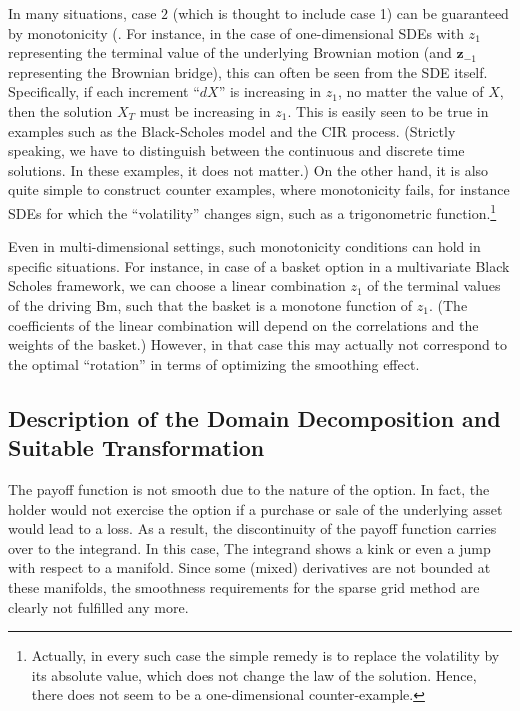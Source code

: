 In many situations, case $2$ (which is thought to include case 1) can be
guaranteed by monotonicity (. For instance, in the case of one-dimensional SDEs
with $z_1$ representing the terminal value of the underlying Brownian motion (and $\mathbf{z}_{-1}$ representing the Brownian bridge), this can often be seen from the SDE itself. Specifically, if each increment ``$dX$'' is increasing in $z_1$, no matter the value of $X$, then the solution $X_T$ must be increasing
in $z_1$. This is easily seen to be true in examples such as the Black-Scholes model and the CIR process. (Strictly speaking, we have to distinguish between the continuous and discrete time solutions. In these examples, it does not matter.) On the other hand, it is also quite simple to construct counter examples, where monotonicity fails, for instance SDEs for which the ``volatility'' changes sign, such as a trigonometric function.\footnote{Actually, in every such case the simple remedy is to replace the volatility by its absolute value, which does not change the law of the solution. Hence, there does not seem to be a one-dimensional counter-example.}

Even in multi-dimensional settings, such monotonicity conditions can hold in specific situations. For instance, in case of a basket option in a multivariate Black Scholes framework, we can choose a linear combination $z_1$ of the terminal values of the driving Bm, such that the basket is a monotone function of $z_1$. (The coefficients of the linear combination will depend on the correlations and the weights of the basket.) However, in that case this may actually not correspond to the optimal ``rotation'' in terms of optimizing the smoothing effect.

\subsection{Description of the Domain Decomposition and Suitable Transformation}\label{sec:Description of the Domain Decomposition and Suitable Transformation}
The payoff function is not smooth due to
the nature of the option. In fact, the holder would not exercise
the option if a purchase or sale of the underlying asset would lead to a loss. As a result, the discontinuity of the payoff function carries over to the integrand. In this case, The integrand shows a kink  or even a jump with respect to a  manifold. Since some
(mixed) derivatives are not bounded at these manifolds, the smoothness requirements for the sparse grid method are clearly not fulfilled any more.

